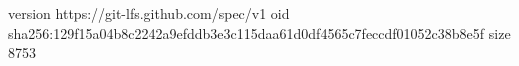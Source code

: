 version https://git-lfs.github.com/spec/v1
oid sha256:129f15a04b8c2242a9efddb3e3c115daa61d0df4565c7feccdf01052c38b8e5f
size 8753
